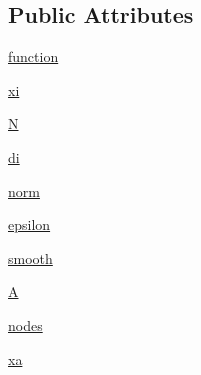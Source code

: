 \subsection*{Public Attributes}
\begin{DoxyCompactItemize}
\item 
\hyperlink{classscipy_1_1interpolate_1_1rbf_1_1Rbf_adae3a26303d4067bbca967c12a5a20cb}{function}
\item 
\hyperlink{classscipy_1_1interpolate_1_1rbf_1_1Rbf_af5d200c0303d7a606e9c68ae19bb308d}{xi}
\item 
\hyperlink{classscipy_1_1interpolate_1_1rbf_1_1Rbf_a08be3ff84003b52e34dfe7adab057c82}{N}
\item 
\hyperlink{classscipy_1_1interpolate_1_1rbf_1_1Rbf_a34196bf3e3be1f597b43bd495c9f189b}{di}
\item 
\hyperlink{classscipy_1_1interpolate_1_1rbf_1_1Rbf_a60d3b97eec4bbf56b1fd17667e6f102c}{norm}
\item 
\hyperlink{classscipy_1_1interpolate_1_1rbf_1_1Rbf_a53e0ee1cb56d26758f4401a803b86ae4}{epsilon}
\item 
\hyperlink{classscipy_1_1interpolate_1_1rbf_1_1Rbf_a162528574686f807f8836f40d8592387}{smooth}
\item 
\hyperlink{classscipy_1_1interpolate_1_1rbf_1_1Rbf_afb2cd343c91507fc1ece660ba091b3d2}{A}
\item 
\hyperlink{classscipy_1_1interpolate_1_1rbf_1_1Rbf_a205ddf5abe6a62201fb48b905e47fe31}{nodes}
\item 
\hyperlink{classscipy_1_1interpolate_1_1rbf_1_1Rbf_ab76f2f6bfa972d44175d1c51507d2e16}{xa}
\end{DoxyCompactItemize}



